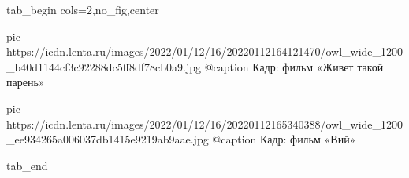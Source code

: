  
 
 
 
 


\ifcmt
  tab_begin cols=2,no_fig,center

     pic https://icdn.lenta.ru/images/2022/01/12/16/20220112164121470/owl_wide_1200_b40d1144cf3c92288dc5ff8df78cb0a9.jpg
		 @caption Кадр: фильм «Живет такой парень»

		 pic https://icdn.lenta.ru/images/2022/01/12/16/20220112165340388/owl_wide_1200_ee934265a006037db1415e9219ab9aae.jpg
		 @caption Кадр: фильм «Вий»

  tab_end
\fi
